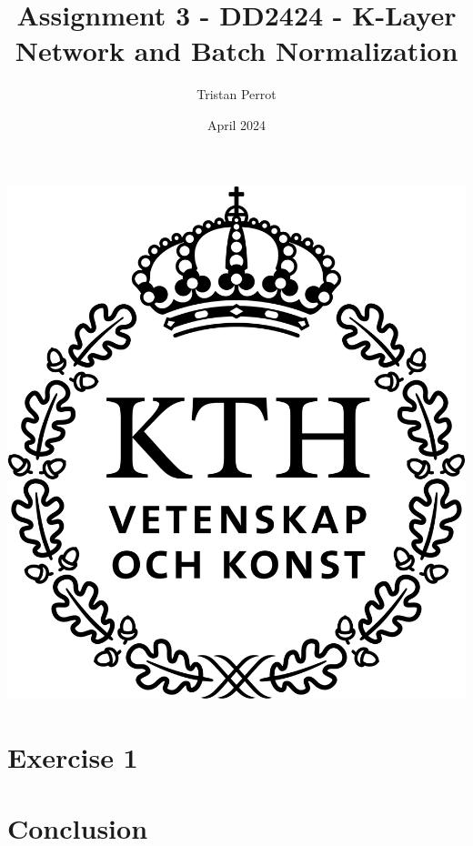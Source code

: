 \documentclass{article}
\title{Assignment 3 - DD2424 - K-Layer Network and Batch Normalization}
\author{Tristan Perrot}
\date{April 2024}
\begin{document}
\maketitle
\begin{center}
    \includegraphics[scale=0.25]{images/KTH_logo_RGB_svart.png}
\end{center}

\section{Exercise 1}

\section{Conclusion}
\end{document}
